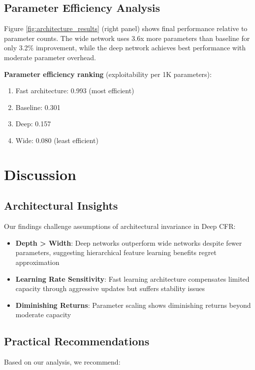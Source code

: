 \documentclass{article}
\begin{document}
\subsection{Parameter Efficiency Analysis}

Figure \ref{fig:architecture_results} (right panel) shows final performance relative to parameter counts. The wide network uses 3.6x more parameters than baseline for only 3.2\% improvement, while the deep network achieves best performance with moderate parameter overhead.

\textbf{Parameter efficiency ranking} (exploitability per 1K parameters):
\begin{enumerate}
\item Fast architecture: 0.993 (most efficient)
\item Baseline: 0.301
\item Deep: 0.157
\item Wide: 0.080 (least efficient)
\end{enumerate}

\section{Discussion}

\subsection{Architectural Insights}

Our findings challenge assumptions of architectural invariance in Deep CFR:

\begin{itemize}
\item \textbf{Depth > Width}: Deep networks outperform wide networks despite fewer parameters, suggesting hierarchical feature learning benefits regret approximation
\item \textbf{Learning Rate Sensitivity}: Fast learning architecture compensates limited capacity through aggressive updates but suffers stability issues
\item \textbf{Diminishing Returns}: Parameter scaling shows diminishing returns beyond moderate capacity
\end{itemize}

\subsection{Practical Recommendations}

Based on our analysis, we recommend:
\end{document}
